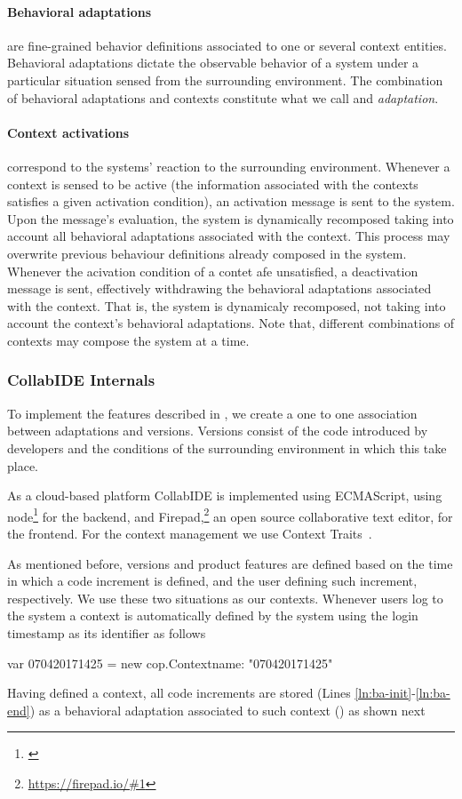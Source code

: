 \paragraph{Behavioral adaptations} are fine-grained behavior definitions associated to one or several context entities. Behavioral adaptations dictate the observable behavior of a system under a particular situation sensed from the surrounding environment. The combination of behavioral adaptations and contexts constitute what we call and \emph{adaptation}.

\paragraph{Context activations} correspond to the systems' reaction to the surrounding environment. Whenever a context is sensed to be active (the information associated with the contexts satisfies a given activation condition), an activation message is sent to the system. Upon the message's evaluation, the system is dynamically recomposed taking into account all behavioral adaptations associated with the context. This process may overwrite previous behaviour definitions already composed in the system. Whenever the acivation condition of a contet afe unsatisfied, a deactivation message is sent, effectively withdrawing the behavioral adaptations associated with the context. That is, the system is dynamicaly recomposed, not taking into account the context's behavioral adaptations.  Note that, different combinations of contexts may compose the system at a time.


\subsubsection{CollabIDE Internals}
To implement the features described in , we create a one to one association between adaptations and versions.
Versions consist of the code introduced by developers and the conditions of the surrounding environment in which this take place. 

As a cloud-based platform CollabIDE is implemented using ECMAScript, using node\footnote{\url{}} for the backend, and Firepad,\footnote{\url{https://firepad.io/\#1}} an open source collaborative text editor, for the frontend.
For the context management we use Context Traits~\cite{gonzalez13}. 

As mentioned before, versions and product features are defined based on the time in which a code increment is defined, and the user defining such increment, respectively. We use these two situations as our contexts.
Whenever users log to the system a context is automatically defined by the system using the login timestamp as its identifier as follows
\begin{ctxtraits}
var 070420171425 = new cop.Context{name: "070420171425"}
\end{ctxtraits}
Having defined a context, all code increments are stored (Lines \ref{ln:ba-init}-\ref{ln:ba-end}) as a behavioral adaptation associated to such context () as shown next
\begin{ctxtraits}

\end{ctxtraits}

